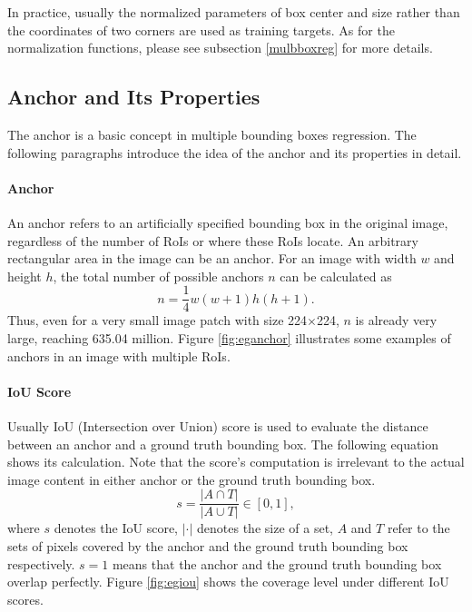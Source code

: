 

In practice, usually the normalized parameters of box center and size rather than the coordinates of two corners are used as training targets. As for the normalization functions, please see subsection \ref{mulbboxreg} for more details.

\subsection{Anchor and Its Properties}\label{ancpro}
The anchor is a basic concept in multiple bounding boxes regression. The following paragraphs introduce the idea of the anchor and its properties in detail.

\paragraph{Anchor}
An anchor refers to an artificially specified bounding box in the original image, regardless of the number of RoIs or where these RoIs locate. An arbitrary rectangular area in the image can be an anchor. For an image with width $w$ and height $h$, the total number of possible anchors $n$ can be calculated as
\begin{equation}\label{eq:numanchor}
	n = \frac{1}{4}w(w+1)h(h+1).
\end{equation}
Thus, even for a very small image patch with size 224$\times$224, $n$ is already very large, reaching 635.04 million. Figure \ref{fig:eganchor} illustrates some examples of anchors in an image with multiple RoIs.



\paragraph{IoU Score}
Usually IoU (Intersection over Union) score is used to evaluate the distance between an anchor and a ground truth bounding box. The following equation shows its calculation. Note that the score's computation is irrelevant to the actual image content in either anchor or the ground truth bounding box.
\begin{equation}
	s = \frac{\lvert A \cap T \rvert}{\lvert A \cup T \rvert} \in [0, 1],
\end{equation}
where $s$ denotes the IoU score, $\lvert \cdot \rvert$ denotes the size of a set, $A$ and $T$ refer to the sets of pixels covered by the anchor and the ground truth bounding box respectively. $s = 1$ means that the anchor and the ground truth bounding box overlap perfectly. Figure \ref{fig:egiou} shows the coverage level under different IoU scores.

